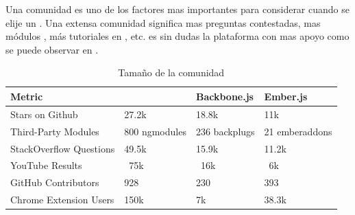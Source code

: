 Una comunidad es uno de los factores mas importantes para considerar cuando se elije un \framework. Una extensa comunidad significa mas preguntas contestadas, mas módulos \thirdParty, más tutoriales en \youtubeNAME, etc. \angularjs es sin dudas la plataforma con mas apoyo como se puede observar en .
%
%
\begin{table}[h!]
    \tiny
   
\begin{tabular}{ |L{0.1\paperwidth}|L{0.2\paperwidth}|L{0.2\paperwidth}|L{0.2\paperwidth}|}
\hline
	Metric&
	\angularjs &
	Backbone.js &
	Ember.js
	
\\ \hline
	Stars on Github&
	27.2k&
	18.8k&
	11k
	
\\ \hline
	Third-Party Modules&
	800 ngmodules&
	236 backplugs&
	21 emberaddons
	
\\ \hline
	StackOverflow Questions&
	49.5k&
	15.9k&
	11.2k
	
\\ \hline
	YouTube Results&
	~75k&
	~16k&
	~6k
	
\\ \hline
	GitHub Contributors&
	928&
	230&
	393
	
\\ \hline
	Chrome Extension Users&
	150k&
	7k&
	38.3k
				
\\ \hline
\end{tabular}
    \caption{ Tamaño de la comunidad}
    \label{tab:framework_community}
\end{table}

